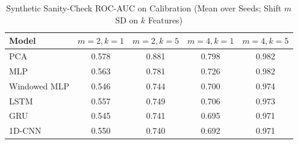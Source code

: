 \documentclass[conference]{IEEEtran}
\begin{document}
\begin{table}[htbp]
\caption{Test Recall by Attack Category at the Frozen Threshold (Mean over Seeds; $n$ = Eligible Attack Minutes)}
\begin{center}
\label{tab:percategory}
\end{center}
\end{table}

\begin{table}[htbp]
\caption{Synthetic Sanity-Check ROC-AUC on Calibration (Mean over Seeds; Shift $m$ SD on $k$ Features)}
\begin{center}
\begin{tabular}{|l|c|c|c|c|}
\hline
\textbf{Model} & $m{=}2,k{=}1$ & $m{=}2,k{=}5$ & $m{=}4,k{=}1$ & $m{=}4,k{=}5$ \\
\hline
PCA & 0.578 & 0.881 & 0.798 & 0.982 \\
MLP & 0.563 & 0.781 & 0.726 & 0.982 \\
Windowed MLP & 0.546 & 0.744 & 0.700 & 0.974 \\
LSTM & 0.557 & 0.749 & 0.706 & 0.973 \\
GRU & 0.545 & 0.741 & 0.695 & 0.971 \\
1D-CNN & 0.550 & 0.740 & 0.692 & 0.971 \\
\hline
\end{tabular}
\label{tab:sanity}
\end{center}
\end{table}
\end{document}
